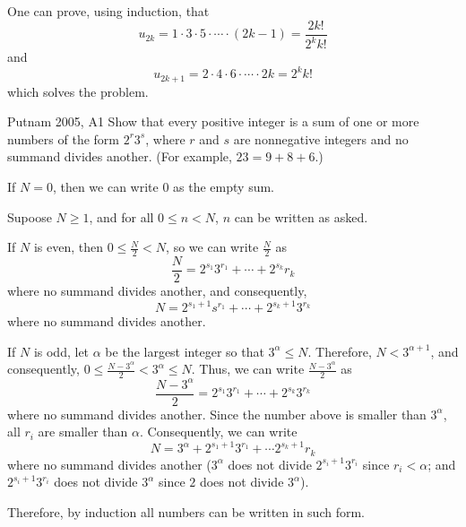 \begin{sk}{}{}
	One can prove, using induction, that \[
		u_{2k} = 1 \cdot 3 \cdot 5 \cdot \cdots \cdot (2k-1) = \frac{2k!}{2^k k!}
	\] and \[
	u_{2k+1} = 2 \cdot 4 \cdot 6 \cdot \cdots \cdot 2k = 2^k k!
	\]
	which solves the problem.
\end{sk}

\begin{prob}{Putnam 2005, A1}{}
	Show that every positive integer is a sum of one or more numbers of the form \(2^r3^s\), where \(r\) and \(s\) are nonnegative integers and no summand divides another. (For example, \(23 = 9 + 8 + 6\).)
\end{prob}

\begin{sol}{}{}
	If \(N = 0\), then we can write \(0\) as the empty sum.

	Supoose \(N \geq 1\), and for all \(0 \leq  n < N\), \(n\) can be written as asked.

	If \(N\) is even, then \(0 \leq \frac{N}{2} < N\), so we can write \(\frac{N}{2}\) as \[
		\frac{N}{2} = 2^{s_1}3^{r_1} + \cdots + 2^{s_k}{r_k}
	\] where no summand divides another, and consequently, \[
		N = 2^{s_1 + 1}s^{r_1} + \cdots + 2^{s_k+1}3^{r_k}
	\] where no summand divides another.

	If \(N\) is odd, let \(\alpha\) be the largest integer so that \(3^\alpha \leq N\).
	Therefore, \(N < 3^{\alpha+1}\), and consequently, \(0 \leq \frac{N - 3^\alpha}{2} < 3^\alpha \leq N\). Thus, we can write \(\frac{N - 3^\alpha}{2}\) as  \[
		\frac{N - 3^\alpha}{2} =  2^{s_1}3^{r_1} + \cdots + 2^{s_k}3^{r_k}
	\] where no summand divides another. Since the number above is smaller than \(3^\alpha\), all \(r_i\) are smaller than \(\alpha\).
	Consequently, we can write \[
		N = 3^\alpha + 2^{s_1 + 1}3^{r_1} + \cdots 2^{s_k + 1}{r_k}
	\] where no summand divides another (\(3^\alpha\) does not divide \(2^{s_i + 1}3^{r_i}\) since \(r_i < \alpha\); and \(2^{s_i + 1}3^{r_i}\) does not divide \(3^\alpha\) since \(2\) does not divide \(3^\alpha\)).

	Therefore, by induction all numbers can be written in such form.

\end{sol}
